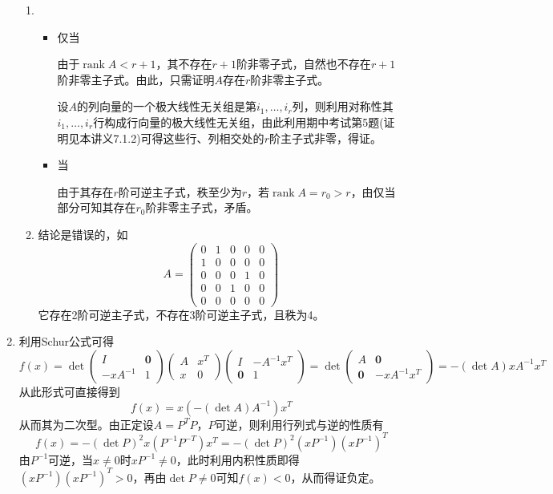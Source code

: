 \documentclass[a4paper,UTF8,fontset=windows]{ctexart}
\DeclareMathOperator{\rank}{rank}
\begin{document}
\begin{enumerate}
\begin{enumerate}
        \item
        \begin{itemize}
            \item 仅当
            
            由于$\rank A<r+1$，其不存在$r+1$阶非零子式，自然也不存在$r+1$阶非零主子式。由此，只需证明$A$存在$r$阶非零主子式。

            设$A$的列向量的一个极大线性无关组是第$i_1,\dots,i_r$列，则利用对称性其$i_1,\dots,i_r$行构成行向量的极大线性无关组，由此利用期中考试第5题(证明见本讲义7.1.2)可得这些行、列相交处的$r$阶主子式非零，得证。

            \item 当
            
            由于其存在$r$阶可逆主子式，秩至少为$r$，若$\rank A=r_0>r$，由仅当部分可知其存在$r_0$阶非零主子式，矛盾。
        \end{itemize}

        \item
        结论是错误的，如
        $$A=\begin{pmatrix}0&1&0&0&0\\1&0&0&0&0\\0&0&0&1&0\\0&0&1&0&0\\0&0&0&0&0\end{pmatrix}$$
        它存在2阶可逆主子式，不存在3阶可逆主子式，且秩为4。
    \end{enumerate}
    
    \item
    利用Schur公式可得
    $$f(x)=\det\begin{pmatrix}I&\mathbf{0}\\-xA^{-1}&1\end{pmatrix}\begin{pmatrix}A&x^T\\x&0\end{pmatrix}\begin{pmatrix}I&-A^{-1}x^T\\\mathbf{0}&1\end{pmatrix}=\det\begin{pmatrix}A&\mathbf{0}\\\mathbf{0}&-xA^{-1}x^T\end{pmatrix}=-(\det A)xA^{-1}x^T$$
    从此形式可直接得到
    $$f(x)=x(-(\det A)A^{-1})x^T$$
    从而其为二次型。由正定设$A=P^TP$，$P$可逆，则利用行列式与逆的性质有
    $$f(x)=-(\det P)^2x(P^{-1}P^{-T})x^T=-(\det P)^2(xP^{-1})(xP^{-1})^T$$
    由$P^{-1}$可逆，当$x\ne0$时$xP^{-1}\ne0$，此时利用内积性质即得$(xP^{-1})(xP^{-1})^T>0$，再由$\det P\ne0$可知$f(x)<0$，从而得证负定。
    

\end{enumerate}
\end{document}
